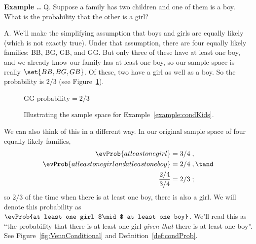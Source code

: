 \documentclass[twoside]{book}\usepackage[]{graphicx}\usepackage[]{xcolor}
\def\question{{\sf Q. }}
\def\answer{{\sf A. }}
\newcounter{example}[section]
\newenvironment{example}%
{\refstepcounter{example}%
\textbf{Example \thesection.\arabic{example}. }}%
{}
\begin{document}
\begin{example}
\label{condKids}%
\label{example:condKids}%
  \question
  Suppose a family has two children and one of them is a boy.
  What is the probability that the other is a girl?

  \answer
  We'll make the simplifying assumption that boys and girls are 
  equally likely (which is not exactly true).  Under that assumption,
  there are four equally likely families:  BB, BG, GB, and GG.  But only three
  of these have at least one boy, and we already know our family has at least one boy, so our sample space is really
  $\set{ BB, BG, GB}$.
  Of these, two have a girl as well as a boy.
  So the probability is $2/3$ (see Figure~\ref{fig:condKids}).  

\begin{figure}[h]
	\begin{center}
	  GG \qquad {}  
	\qquad \qquad $\mbox{probability}=2/3$
  \end{center}
\caption{Illustrating the sample space for Example~\ref{example:condKids}.}
\label{fig:condKids}%
\end{figure}

  We can also think of this in a different way.   In our original sample space
  of four equally likely families,
  \begin{align*}
	\evProb{at least one girl} & =  3/4 \; , \\ %
	\evProb{at least one girl \emph{and} at least one boy} & =  2/4 \; , \tand\\
	\frac{2/4}{3/4} & =  2/3 \; ;
  \end{align*}
  so $2/3$ of the time when there is at least one boy, there is also a girl.
  We will denote this probability as 
  $\evProb{at least one girl $\mid$ at least one boy}$.
  We'll read this as ``the probability that there is at least one girl \emph{given that} 
  there is at least one boy''.  
  See Figure~\ref{fig:VennConditional} and Definition~\ref{def:condProb}.
\end{example}
\end{document}
